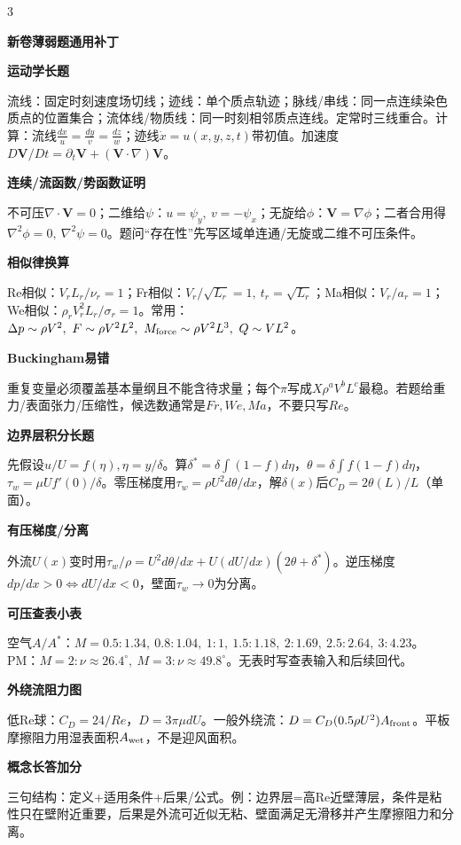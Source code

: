 \documentclass[a4paper]{article}
\newcommand{\qt}[1]{\vspace{0.25pt}\colorbox{Q}{\parbox{\dimexpr\linewidth-2\fboxsep}{\color{white}\bfseries #1}}\par}
\newcommand{\sect}[1]{\qt{#1}}
\begin{document}
\begin{multicols}{3}
{\sect{新卷薄弱题通用补丁}
\sect{运动学长题}
流线：固定时刻速度场切线；迹线：单个质点轨迹；脉线/串线：同一点连续染色质点的位置集合；流体线/物质线：同一时刻相邻质点连线。定常时三线重合。计算：流线$\frac{dx}{u}=\frac{dy}{v}=\frac{dz}{w}$；迹线$\dot x=u(x,y,z,t)$带初值。加速度$D\bm V/Dt=\partial_t\bm V+(\bm V\cdot\nabla)\bm V$。
\sect{连续/流函数/势函数证明}
不可压$\nabla\cdot\bm V=0$；二维给$\psi$：$u=\psi_y,\ v=-\psi_x$；无旋给$\phi$：$\bm V=\nabla\phi$；二者合用得$\nabla^2\phi=0,\ \nabla^2\psi=0$。题问“存在性”先写区域单连通/无旋或二维不可压条件。
\sect{相似律换算}
Re相似：$V_rL_r/\nu_r=1$；Fr相似：$V_r/\sqrt{L_r}=1,\ t_r=\sqrt{L_r}$；Ma相似：$V_r/a_r=1$；We相似：$\rho_rV_r^2L_r/\sigma_r=1$。常用：$\Delta p\sim\rho V^2,\ F\sim\rho V^2L^2,\ M_{\rm force}\sim\rho V^2L^3,\ Q\sim VL^2$。
\sect{Buckingham易错}
重复变量必须覆盖基本量纲且不能含待求量；每个$\pi$写成$X\rho^aV^bL^c$最稳。若题给重力/表面张力/压缩性，候选数通常是$Fr,We,Ma$，不要只写$Re$。
\sect{边界层积分长题}
先假设$u/U=f(\eta),\eta=y/\delta$。算$\delta^*=\delta\int(1-f)d\eta$，$\theta=\delta\int f(1-f)d\eta$，$\tau_w=\mu U f'(0)/\delta$。零压梯度用$\tau_w=\rho U^2d\theta/dx$，解$\delta(x)$后$C_D=2\theta(L)/L$（单面）。
\sect{有压梯度/分离}
外流$U(x)$变时用$\tau_w/\rho=U^2d\theta/dx+U(dU/dx)(2\theta+\delta^*)$。逆压梯度$dp/dx>0\Leftrightarrow dU/dx<0$，壁面$\tau_w\to0$为分离。
\sect{可压查表小表}
空气$A/A^*$：$M=0.5:1.34,\ 0.8:1.04,\ 1:1,\ 1.5:1.18,\ 2:1.69,\ 2.5:2.64,\ 3:4.23$。PM：$M=2:\nu\approx26.4^\circ,\ M=3:\nu\approx49.8^\circ$。无表时写查表输入和后续回代。
\sect{外绕流阻力图}
低Re球：$C_D=24/Re$，$D=3\pi\mu dU$。一般外绕流：$D=C_D(0.5\rho U^2)A_{\rm front}$。平板摩擦阻力用湿表面积$A_{\rm wet}$，不是迎风面积。
\sect{概念长答加分}
三句结构：定义+适用条件+后果/公式。例：边界层=高Re近壁薄层，条件是粘性只在壁附近重要，后果是外流可近似无粘、壁面满足无滑移并产生摩擦阻力和分离。

}
\end{multicols}
\end{document}
